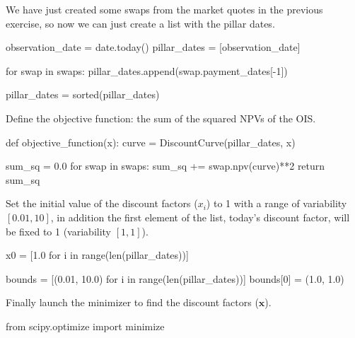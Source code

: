 \cprotEnv\begin{solution}
We have just created some swaps from the market quotes in the previous exercise, so now we can just create a list with the pillar dates.

\begin{ipython}
observation_date = date.today()
pillar_dates = [observation_date]

for swap in swaps:
    pillar_dates.append(swap.payment_dates[-1])

pillar_dates = sorted(pillar_dates)
\end{ipython}
Define the objective function: the sum of the squared NPVs of the OIS.
\begin{ipython}
def objective_function(x):
    curve = DiscountCurve(pillar_dates, x)

    sum_sq = 0.0
    for swap in swaps:
        sum_sq += swap.npv(curve)**2
    return sum_sq
\end{ipython}
Set the initial value of the discount factors (\(x_i\)) to 1 with a range of variability \([ 0.01, 10]\), in addition the first element of the list, today's discount factor, will be fixed to 1 (variability \([1, 1]\)).

\begin{ipython}
x0 = [1.0 for i in range(len(pillar_dates))]

bounds = [(0.01, 10.0) for i in range(len(pillar_dates))]
bounds[0] = (1.0, 1.0)
\end{ipython}
Finally launch the minimizer to find the discount factors (\(\mathbf{x}\)).

\begin{ipython}
from scipy.optimize import minimize


\end{ipython}
\end{solution}
